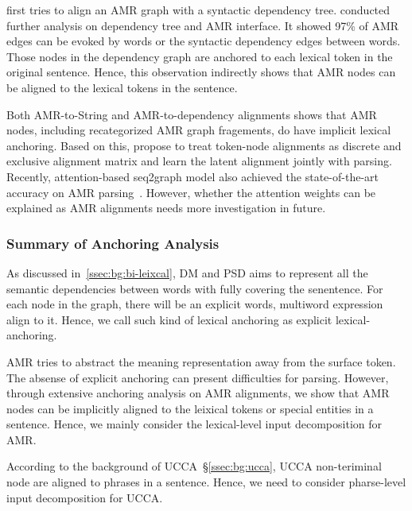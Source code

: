  \citet{chen2017unsupervised}
first tries to align an AMR graph with a syntactic dependency tree.
\citet{szubert2018structured} conducted further analysis on dependency
tree and AMR interface. It showed 97\% of AMR edges can be evoked by
words or the syntactic dependency edges between words.  Those nodes in
the dependency graph are anchored to each lexical token in the
original sentence. Hence, this observation indirectly shows that AMR
nodes can be aligned to the lexical tokens in the sentence.

Both AMR-to-String and AMR-to-dependency alignments shows that AMR
nodes, including recategorized AMR graph fragements, do have implicit
lexical anchoring. Based on this, \citet{lyu2018amr} propose to treat
token-node alignments as discrete and exclusive alignment matrix and
learn the latent alignment jointly with parsing. Recently,
attention-based seq2graph model also achieved the state-of-the-art
accuracy on AMR parsing~\cite{zhang-etal-2018-stog}.  However, whether
the attention weights can be explained as AMR alignments needs more
investigation in future.

%

\subsubsection{Summary of Anchoring Analysis}

As discussed in~\autoref{ssec:bg:bi-leixcal}, DM and PSD aims to
represent all the semantic dependencies between words with fully
covering the senentence. For each node in the graph, there will be an
explicit words, multiword expression align to it. Hence, we call such
kind of lexical anchoring as explicit lexical-anchoring.

AMR tries to abstract the meaning representation away from the surface
token. The absense of explicit anchoring can present difficulties for
parsing. However, through extensive anchoring analysis on AMR
alignments, we show that AMR nodes can be implicitly aligned to the
leixical tokens or special entities in a sentence. Hence, we mainly
consider the lexical-level input decomposition for AMR.

 According to the
background of UCCA~\S\ref{ssec:bg:ucca}, UCCA non-teriminal node are
aligned to phrases in a sentence. Hence, we need to consider
pharse-level input decomposition for UCCA.


